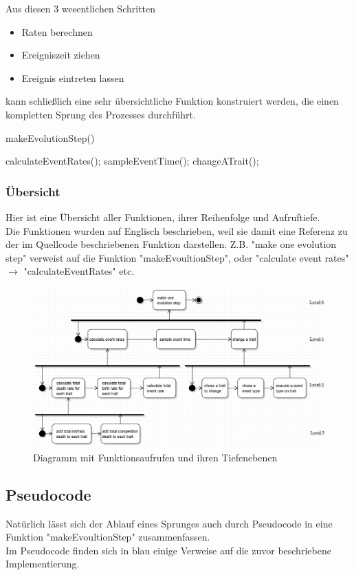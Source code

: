 \documentclass[11pt, a4paper, german]{article}
\theoremstyle{plain}
\begin{document}
	Aus diesen 3 wesentlichen Schritten
	\begin{itemize}
		\item Raten berechnen
		\item Ereigniszeit ziehen
		\item Ereignis eintreten lassen
	\end{itemize}
	kann schließlich eine sehr übersichtliche Funktion konstruiert werden, die einen kompletten Sprung des Prozesses durchführt.
	\begin{algorithm}[H]
 		\caption{makeEvolutionStep()}
 		\begin{algorithmic}[1]
 			\State calculateEventRates();
 			\State sampleEventTime();
 			\State changeATrait();
 		\end{algorithmic}
 	\end{algorithm}
	 	
	\subsubsection{Übersicht}
	Hier ist eine Übersicht aller Funktionen, ihrer Reihenfolge und Aufruftiefe. \\
	Die Funktionen wurden auf Englisch beschrieben, weil sie damit eine Referenz zu der im Quellcode beschriebenen Funktion darstellen. Z.B. "{}make one evolution step"{} verweist auf die Funktion "{}makeEvoultionStep"{}, oder "{}calculate event rates"{} $ \to $ "{}calculateEventRates"{} etc.
	\begin{figure}[H]
		\centering
		\includegraphics[width=1\linewidth]{../UMLs/PseudoCodeForBThesis}
		\caption{Diagramm mit Funktionsaufrufen und ihren Tiefenebenen}
		\label{fig:PseudoCodeForBThesis}
	\end{figure}
	
	\subsection{Pseudocode}
	Natürlich lässt sich der Ablauf eines Sprunges auch durch Pseudocode in eine Funktion "{}makeEvoultionStep"{} zusammenfassen.\\
	Im Pseudocode finden sich in blau einige Verweise auf die zuvor beschriebene Implementierung.
	
\end{document}

